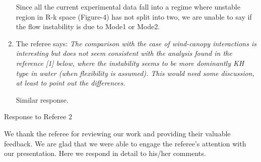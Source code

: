 \documentclass[letterpaper,10pt]{article}
\begin{document}
\begin{enumerate}
Since all the current experimental data fall into a regime where unstable region in R-k space (Figure-4) has not split into two, we are unable to say if the flow instability is due to Mode1 or Mode2. 

\item The referee says:
\textit{
The comparison with the case of wind-canopy interactions is interesting but does not seem consistent with the analysis found in the reference [1]  below, where the instability seems to be more dominantly KH type in water  (when flexibility is assumed).  This would need some discussion, at least to point out the differences.
}

Similar response.

\end{enumerate}

\newpage
\centerline{Response to Referee 2}
We thank the referee for reviewing our work and providing their valuable feedback. 
We are glad that we were able to engage the referee's attention with our presentation.
Here we respond in detail to his/her comments.
\end{document}
